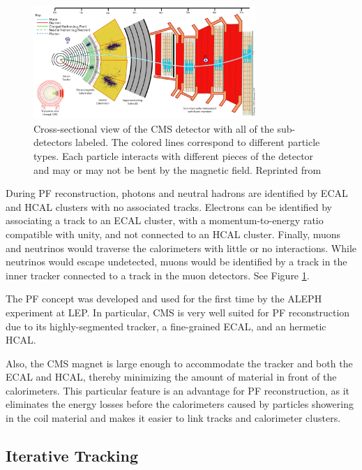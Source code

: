  \begin{figure}[h]
  	\label{fig:cmsslice}
 	\centering
 	\includegraphics[width=0.75\textwidth]{figures/image005.png}
 	\singlespace
 	\caption{Cross-sectional view of the CMS detector with all of the sub-detectors labeled. The colored lines correspond to different particle types. Each particle interacts with different pieces of the detector and may or may not be bent by the magnetic field. Reprinted from \cite{CMSSlice}}
 \end{figure}

During PF reconstruction, photons and neutral hadrons are identified by ECAL and HCAL clusters with no associated tracks. Electrons can be identified by associating a track to an ECAL cluster, with a momentum-to-energy ratio compatible with unity, and not connected to an HCAL cluster. Finally, muons and neutrinos would traverse the calorimeters with little or no interactions. While neutrinos would escape undetected, muons would be identified by a track in the inner tracker connected to a track in the muon detectors. See Figure \ref{fig:cmsslice}.

The PF concept was developed and used for the first time by the ALEPH experiment at LEP\cite{BUSKULIC1995481}. In particular, CMS is very well suited for PF reconstruction due to its highly-segmented tracker,  a fine-grained ECAL, and an hermetic HCAL.

Also, the CMS magnet is large enough to accommodate the tracker and both the ECAL and HCAL, thereby minimizing the amount of material in front of the calorimeters. This particular feature is an advantage for PF reconstruction, as it eliminates the energy losses before the calorimeters caused by particles showering in the coil material and makes it easier to link tracks and calorimeter clusters.

\subsection{Iterative Tracking}

